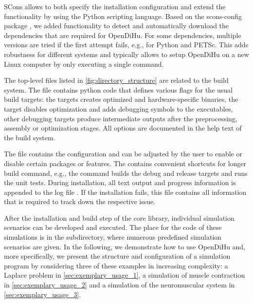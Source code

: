 SCons allows to both specify the installation configuration and extend the functionality by using the Python scripting language. Based on the scons-config package \cite{sconsconfig}, we added functionality to detect and automatically download the dependencies that are required for OpenDiHu. For some dependencies, multiple versions are tried if the first attempt fails, e.g., for Python and PETSc.
This adds robustness for different systems and typically allows to setup OpenDiHu on a new Linux computer by only executing a single  command.

The top-level files listed in \cref{fig:directory_structure} are related to the build system. The file  contains python code that defines various flags for the usual build targets: the  targets creates optimized and hardware-specific binaries, the  target disables optimization and adds debugging symbols to the executables, other debugging targets produce intermediate outputs after the  preprocessing, assembly or optimization stages. All options are documented in the help text of the build system.

The  file contains the configuration and can be adjusted by the user to enable or disable certain packages or features. The  contains convenient shortcuts for longer build command, e.g., the command  builds the debug and release targets and runs the unit tests. During installation, all text output and progress information is appended to the log file . If the installation fails, this file contains all information that is required to track down the respective issue.

After the installation and build step of the core library, individual simulation scenarios can be developed and executed. The place for the code of these simulations is in the  subdirectory, where numerous predefined simulation scenarios are given. In the following, we demonstrate how to use OpenDiHu and, more specifically, we present the structure and configuration of a simulation program by considering three of these examples in increasing complexity: a Laplace problem in \cref{sec:exemplary_usage_1}, a simulation of muscle contraction in \cref{sec:exemplary_usage_2} and a simulation of the neuromuscular system in \cref{sec:exemplary_usage_3}.

